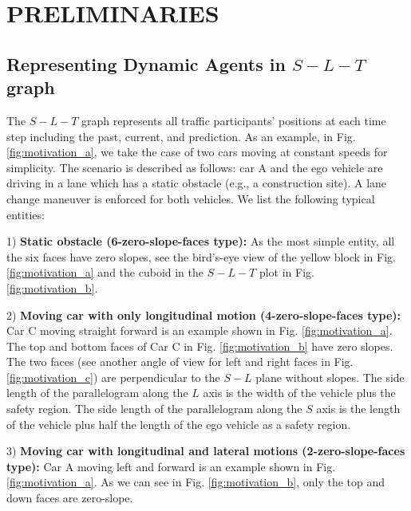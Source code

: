 \documentclass[journal,a4paper,onecolumn,12pt]{IEEEtran}
\begin{document}
\section{PRELIMINARIES}

\subsection{Representing Dynamic Agents in $S-L-T$ graph}
The $S - L - T$ graph represents all traffic participants' positions at each time step including the past, current, and prediction.
As an example, in Fig. \ref{fig:motivation_a}, we take the case of two cars moving at constant speeds for simplicity. The scenario is described as follows: car A and the ego vehicle are driving in a lane which has a static obstacle (e.g., a construction site). A lane change maneuver is enforced for both vehicles. We list the following typical entities:

1) \textbf{Static obstacle (6-zero-slope-faces type):} As the most simple entity, all the six faces have zero slopes, see the bird's-eye view of the yellow block in Fig. \ref{fig:motivation_a} and the cuboid in the $S-L-T$ plot in Fig. \ref{fig:motivation_b}.

2) \textbf{Moving car with only longitudinal motion (4-zero-slope-faces type):} Car C moving straight forward is an example shown in Fig. \ref{fig:motivation_a}. The top and bottom faces of Car C in Fig. \ref{fig:motivation_b} have zero slopes. The two faces (see another angle of view for left and right faces in Fig. \ref{fig:motivation_c}) are perpendicular to the $S-L$ plane without slopes. The side length of the parallelogram along the $L$ axis is the width of the vehicle plus the safety region. The side length of the parallelogram along the $S$ axis is the length of the vehicle plus half the length of the ego vehicle as a safety region.

3) \textbf{Moving car with longitudinal and lateral motions (2-zero-slope-faces type):} Car A moving left and forward is an example shown in Fig. \ref{fig:motivation_a}. As we can see in Fig. \ref{fig:motivation_b}, only the top and down faces are zero-slope.
\end{document}
